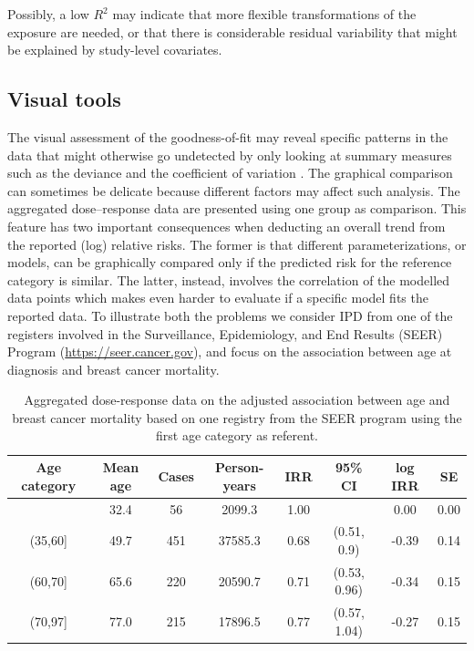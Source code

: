\documentclass[11pt,a4paper,twoside,openany]{book}\usepackage{knitr}
\begin{document}
{Possibly, a low $R^2$ may indicate that more flexible transformations of the exposure are needed, or that there is considerable residual variability that might be explained by study-level covariates.

\subsection{Visual tools}



The visual assessment of the goodness-of-fit may reveal specific patterns in the data that might otherwise go undetected by only looking at summary measures such as the deviance and the coefficient of variation \citep{kvaalseth1985cautionary}. The graphical comparison can sometimes be delicate because different factors may affect such analysis. The aggregated dose--response data are presented using one group as comparison. This feature has two important consequences when deducting an overall trend from the reported (log) relative risks. The former is that different parameterizations, or models, can be graphically compared only if the predicted risk for the reference category is similar. The latter, instead, involves the correlation of the modelled data points which makes even harder to evaluate if a specific model fits the reported data. To illustrate both the problems we consider IPD from one of the registers involved in the Surveillance, Epidemiology, and End Results (SEER) Program (\url{https://seer.cancer.gov}), and focus on the association between age at diagnosis and breast cancer mortality. 

\begin{table}[ht]
\centering
\caption{Aggregated dose-response data on the adjusted association between age and breast cancer mortality based on one registry from the SEER program using the first age category as referent.
         } 
\label{tab:breast_ad}
\begin{tabular}{cccccccc}
  \hline
Age category & Mean age & Cases & Person-years & IRR & 95\% CI & log IRR & SE \\ 
  \hline
[20,35] & 32.4 & 56 & 2099.3 & 1.00 &  & 0.00 & 0.00 \\ 
  (35,60] & 49.7 & 451 & 37585.3 & 0.68 & (0.51, 0.9) & -0.39 & 0.14 \\ 
  (60,70] & 65.6 & 220 & 20590.7 & 0.71 & (0.53, 0.96) & -0.34 & 0.15 \\ 
  (70,97] & 77.0 & 215 & 17896.5 & 0.77 & (0.57, 1.04) & -0.27 & 0.15 \\ 
   \hline
\end{tabular}
\end{table}


}
\end{document}
